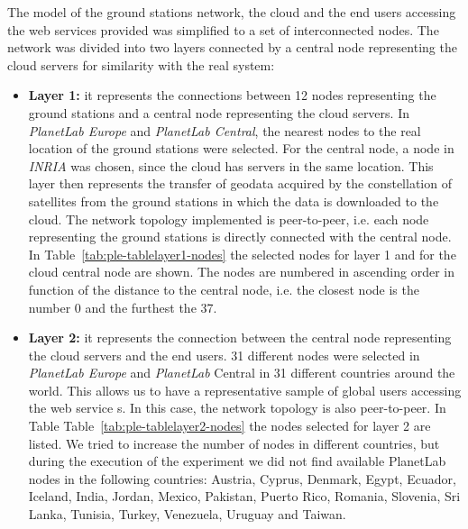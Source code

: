 The model of the ground stations network, the cloud and the end users accessing
the web services provided was simplified to a set of interconnected nodes. The
network was divided into two layers connected by a central node representing the
cloud servers for similarity with the real system:
\begin{itemize}

\item \textbf{Layer 1:} it represents the connections between 12 nodes
  representing the ground stations and a central node representing the cloud
  servers. In \emph{PlanetLab Europe} and \emph{PlanetLab Central}, the nearest nodes to the
  real location of the ground stations were selected. For the central node, a
  node in \emph{INRIA} was chosen, since the \bonfire cloud has servers in the same
  location. This layer then represents the transfer of geodata acquired by the
  constellation of satellites from the ground stations in which the data is
  downloaded to the cloud. The network topology implemented is peer-to-peer,
  i.e. each node representing the ground stations is directly connected with the
  central node. In Table~\ref{tab:ple-tablelayer1-nodes} the \pl selected nodes for layer 1 and for the
  cloud central node are shown. The nodes are numbered in ascending order in
  function of the distance to the central node, i.e. the closest node is the
  number 0 and the furthest the 37.

%   


\item \textbf{Layer 2:} it represents the connection between the central node
  representing the cloud servers and the end users. 31 different nodes were
  selected in \emph{PlanetLab Europe} and \emph{PlanetLab} Central in 31 different countries
  around the world. This allows us to have a representative sample of global
  users accessing the web service
s. In this case, the network topology is also peer-to-peer. In Table Table~\ref{tab:ple-tablelayer2-nodes} the nodes selected for layer 2 are listed. We tried to increase the number of nodes in different countries, but during the execution of the experiment we did not find available PlanetLab nodes in the following countries: Austria, Cyprus, Denmark, Egypt, Ecuador, Iceland, India, Jordan, Mexico, Pakistan, Puerto Rico, Romania, Slovenia, Sri Lanka, Tunisia, Turkey, Venezuela, Uruguay and Taiwan.
\end{itemize}


